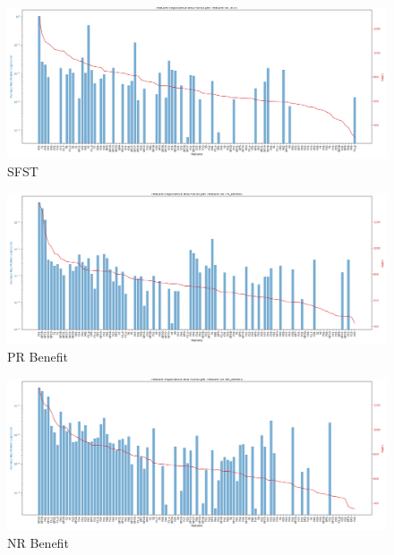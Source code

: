 \begin{figure}
    \centering
    \includegraphics[width=0.95\linewidth]{./causalml_section/graphs/feature_importance_points_plot_SFST.png}
    \caption{SFST}
    \label{fig:sfst_causalml}
\end{figure}



\begin{figure}
    \centering
    \includegraphics[width=0.95\linewidth]{./causalml_section/graphs/feature_importance_points_plot_PR_Benefit.png}
    \caption{PR Benefit}
    \label{fig:pr_ben_causalml}
\end{figure}

\begin{figure}
    \centering
    \includegraphics[width=0.95\linewidth]{./causalml_section/graphs/feature_importance_points_plot_NR_Benefit.png}
    \caption{NR Benefit}
    \label{fig:nr_ben_causalml}
\end{figure}

